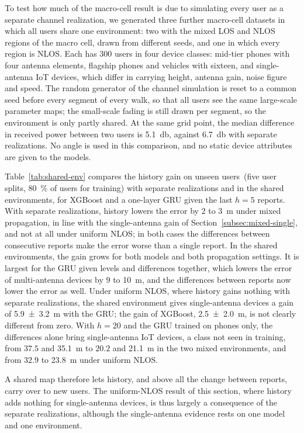 To test how much of the macro-cell result is due to simulating every user as a separate channel realization, we generated three further macro-cell datasets in which all users share one environment: two with the mixed LOS and NLOS regions of the macro cell, drawn from different seeds, and one in which every region is NLOS. Each has $300$ users in four device classes: mid-tier phones with four antenna elements, flagship phones and vehicles with sixteen, and single-antenna IoT devices, which differ in carrying height, antenna gain, noise figure and speed. The random generator of the channel simulation is reset to a common seed before every segment of every walk, so that all users see the same large-scale parameter maps; the small-scale fading is still drawn per segment, so the environment is only partly shared. At the same grid point, the median difference in received power between two users is \SI{5.1}{\decibel}, against \SI{6.7}{\decibel} with separate realizations. No angle is used in this comparison, and no static device attributes are given to the models.

Table~\ref{tab:shared-env} compares the history gain on unseen users~(five user splits, \SI{80}{\percent} of users for training) with separate realizations and in the shared environments, for XGBoost and a one-layer GRU given the last $h=5$ reports. With separate realizations, history lowers the error by $2$ to \SI{3}{\meter} under mixed propagation, in line with the single-antenna gain of Section~\ref{subsec:mixed-single}, and not at all under uniform NLOS; in both cases the differences between consecutive reports make the error worse than a single report. In the shared environments, the gain grows for both models and both propagation settings. It is largest for the GRU given levels and differences together, which lowers the error of multi-antenna devices by $9$ to \SI{10}{\meter}, and the differences between reports now lower the error as well. Under uniform NLOS, where history gains nothing with separate realizations, the shared environment gives single-antenna devices a gain of \SI{5.9 +- 3.2}{\meter} with the GRU; the gain of XGBoost, \SI{2.5 +- 2.0}{\meter}, is not clearly different from zero. With $h=20$ and the GRU trained on phones only, the differences alone bring single-antenna IoT devices, a class not seen in training, from $37.5$ and \SI{35.1}{\meter} to $20.2$ and \SI{21.1}{\meter} in the two mixed environments, and from $32.9$ to \SI{23.8}{\meter} under uniform NLOS.

A shared map therefore lets history, and above all the change between reports, carry over to new users. The uniform-NLOS result of this section, where history adds nothing for single-antenna devices, is thus largely a consequence of the separate realizations, although the single-antenna evidence rests on one model and one environment.

